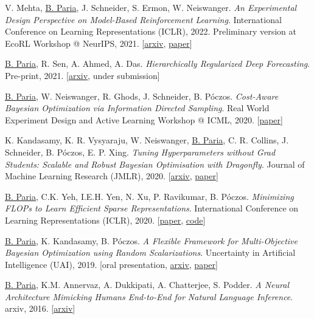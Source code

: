 \documentclass[10pt]{article}
\newcommand{\halfblankline}{\quad\vspace{-0.4\baselineskip}\pagebreak[3]}
\newcommand{\biswa}{\underline{B. Paria}}
\newcommand{\ambedkar}{A. Dukkipati}
\newcommand{\annervaz}{K.M. Annervaz}
\newcommand{\barnabas}{B. P\'oczos}
\newcommand{\samy}{K. Kandasamy}
\begin{document}
V. Mehta, \biswa, J. Schneider, S. Ermon, W. Neiswanger. \emph{An Experimental Design Perspective on Model-Based Reinforcement Learning}. International Conference on Learning Representations (ICLR), 2022. Preliminary version at EcoRL Workshop @ NeurIPS, 2021.
[\href{https://arxiv.org/abs/2112.05244}{arxiv}, \href{https://openreview.net/pdf?id=0no8Motr-zO}{paper}]
\\ \halfblankline

\biswa, R. Sen, A. Ahmed, A. Das. \emph{Hierarchically Regularized Deep Forecasting}. Pre-print, 2021. [\href{https://arxiv.org/abs/2106.07630}{arxiv}, under submission]
\\ \halfblankline

\biswa, W. Neiswanger, R. Ghods, J. Schneider, \barnabas. \emph{Cost-Aware Bayesian Optimization via Information Directed Sampling}. Real World Experiment Design and Active Learning Workshop @ ICML, 2020. [\href{https://realworldml.github.io/files/cr/29_Cost_Aware_BO_ICML_2020_Workshop.pdf}{paper}]
\\ \halfblankline

\samy, K. R. Vysyaraju, W. Neiswanger, \biswa, C. R. Collins, J. Schneider, \barnabas, E. P. Xing. \emph{Tuning Hyperparameters without Grad Students: Scalable and Robust Bayesian Optimisation with Dragonfly}. Journal of Machine Learning Research (JMLR), 2020. [\href{https://arxiv.org/abs/1903.06694}{arxiv}, \href{https://jmlr.csail.mit.edu/papers/volume21/18-223/18-223.pdf}{paper}]
\\ \halfblankline

\biswa, C.K. Yeh, I.E.H. Yen, N. Xu, P. Ravikumar, \barnabas. \emph{Minimizing FLOPs to Learn Efficient Sparse Representations}. International Conference on Learning Representations (ICLR), 2020. [\href{https://openreview.net/pdf?id=SygpC6Ntvr}{paper}, \href{https://github.com/biswajitsc/sparse-embed}{code}]
\\ \halfblankline

\biswa, \samy, \barnabas. \emph{A Flexible Framework for Multi-Objective Bayesian Optimization using Random Scalarizations}. Uncertainty in Artificial Intelligence (UAI), 2019.
[oral presentation, \href{https://arxiv.org/abs/1805.12168}{arxiv}, \href{http://auai.org/uai2019/proceedings/papers/267.pdf}{paper}]
\\ \halfblankline

\biswa, \annervaz, \ambedkar, A. Chatterjee, S. Podder. \emph{A Neural Architecture Mimicking Humans End-to-End for Natural Language Inference}. arxiv, 2016. [\href{https://arxiv.org/abs/1611.04741}{arxiv}]
\\ \halfblankline
\end{document}
